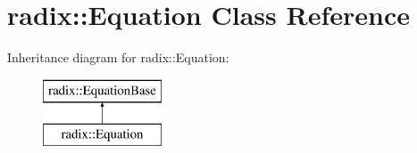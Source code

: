 \hypertarget{classradix_1_1Equation}{}\section{radix\+:\+:Equation Class Reference}
\label{classradix_1_1Equation}
Inheritance diagram for radix\+:\+:Equation\+:\begin{figure}[H]
\begin{center}
\leavevmode
\includegraphics[height=2.000000cm]{classradix_1_1Equation}
\end{center}
\end{figure}
